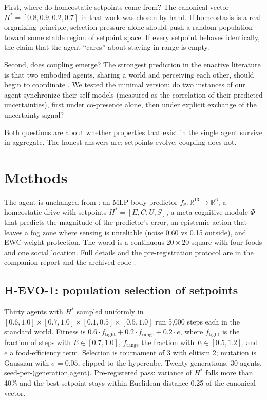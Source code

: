 \documentclass[11pt,a4paper]{article}
\begin{document}
First, where do homeostatic setpoints come from? The canonical vector $H^*=[0.8,0.9,0.2,0.7]$ in that work was chosen by hand. If homeostasis is a real organizing principle, selection pressure alone should push a random population toward some stable region of setpoint space. If every setpoint behaves identically, the claim that the agent ``cares'' about staying in range is empty.

Second, does coupling emerge? The strongest prediction in the enactive literature is that two embodied agents, sharing a world and perceiving each other, should begin to coordinate \cite{thompson2007, oregan2001}. We tested the minimal version: do two instances of our agent synchronize their self-models (measured as the correlation of their predicted uncertainties), first under co-presence alone, then under explicit exchange of the uncertainty signal?

Both questions are about whether properties that exist in the single agent survive in aggregate. The honest answers are: setpoints evolve; coupling does not.

\section{Methods}

The agent is unchanged from \cite{v012}: an MLP body predictor $f_\theta: \mathbb{R}^{13}\to\mathbb{R}^6$, a homeostatic drive with setpoints $H^*=[E,C,U,S]$, a meta-cognitive module $\Phi$ that predicts the magnitude of the predictor's error, an epistemic action that leaves a fog zone where sensing is unreliable (noise 0.60 vs 0.15 outside), and EWC weight protection. The world is a continuous $20\times20$ square with four foods and one social location. Full details and the pre-registration protocol are in the companion report and the archived code \cite{v012}.

\subsection{H-EVO-1: population selection of setpoints}
Thirty agents with $H^*$ sampled uniformly in $[0.6,1.0]\times[0.7,1.0]\times[0.1,0.5]\times[0.5,1.0]$ run 5,000 steps each in the standard world. Fitness is $0.6\cdot f_{\mathrm{tight}} + 0.2\cdot f_{\mathrm{range}} + 0.2\cdot e$, where $f_{\mathrm{tight}}$ is the fraction of steps with $E\in[0.7,1.0]$, $f_{\mathrm{range}}$ the fraction with $E\in[0.5,1.2]$, and $e$ a food-efficiency term. Selection is tournament of 3 with elitism 2; mutation is Gaussian with $\sigma=0.05$, clipped to the hypercube. Twenty generations, 30 agents, seed-per-(generation,agent). Pre-registered pass: variance of $H^*$ falls more than 40\% and the best setpoint stays within Euclidean distance 0.25 of the canonical vector.
\end{document}

